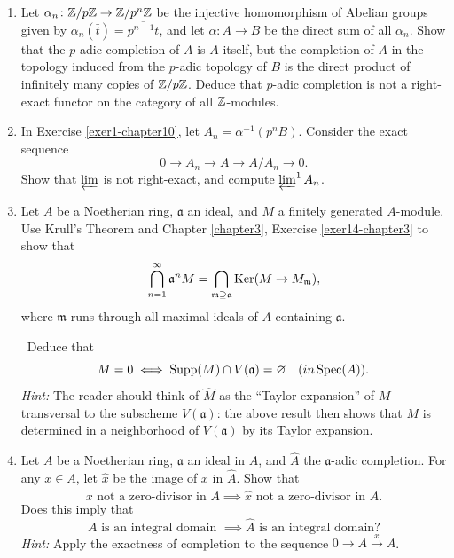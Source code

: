 
\begin{enumerate}
    \item \label{exer1-chapter10}Let $\alpha_n \colon \mathbb{Z}/p\mathbb{Z} \to \mathbb{Z}/p^n\mathbb{Z}$ be the injective homomorphism of Abelian groups given by $\alpha_n(\bar{t}) = \overline{p^{n-1}t}$, and let $\alpha \colon A \to B$ be the direct sum of all $\alpha_n$. Show that the $p$-adic completion of $A$ is $A$ itself, but the completion of $A$ in the topology induced from the $p$-adic topology of $B$ is the direct product of infinitely many copies of $\mathbb{Z}/p\mathbb{Z}$. Deduce that $p$-adic completion is not a right-exact functor on the category of all $\mathbb{Z}$-modules.

    \item \label{exer2-chapter10}In Exercise \ref{exer1-chapter10}, let $A_n = \alpha^{-1}(p^n B)$. Consider the exact sequence
    \[
    0 \longrightarrow A_n \longrightarrow A \longrightarrow A/A_n \longrightarrow 0.
    \]
    Show that $\varprojlim$ is not right-exact, and compute $\varprojlim^1 A_n$.

    \item \label{exer3-chapter10}Let $A$ be a Noetherian ring, $\mathfrak{a}$ an ideal, and $M$ a finitely generated $A$-module. Use Krull's Theorem and Chapter \ref{chapter3}, Exercise \ref{exer14-chapter3} to show that
    \[
    \bigcap_{n=1}^\infty \mathfrak{a}^n M = \bigcap_{\mathfrak{m} \supseteq \mathfrak{a}} \operatorname{Ker}(M \to M_{\mathfrak{m}}),
    \]
    where $\mathfrak{m}$ runs through all maximal ideals of $A$ containing $\mathfrak{a}$.

    \quad\, Deduce that \[M = 0 \iff \operatorname{Supp}(M) \cap V(\mathfrak{a}) = \varnothing \quad (in \operatorname{Spec}(A)).\]
    \textit{Hint: } The reader should think of $\hat{M}$ as the ``Taylor expansion'' of $M$ transversal to the subscheme $V(\mathfrak{a})$: the above result then shows that $M$ is determined in a neighborhood of $V(\mathfrak{a})$ by its Taylor expansion.

    \item \label{exer4-chapter10}Let $A$ be a Noetherian ring, $\mathfrak{a}$ an ideal in $A$, and $\hat{A}$ the $\mathfrak{a}$-adic completion. For any $x \in A$, let $\hat{x}$ be the image of $x$ in $\hat{A}$. Show that
    \[
    x \text{ not a zero-divisor in } A \implies \hat{x} \text{ not a zero-divisor in } \hat{A}.
    \]
    Does this imply that
    \[
    A \text{ is an integral domain } \implies \hat{A} \text{ is an integral domain}?
    \]
    \textit{Hint:} Apply the exactness of completion to the sequence $0 \longrightarrow A \stackrel{x}{\longrightarrow} A$.


\end{enumerate}
